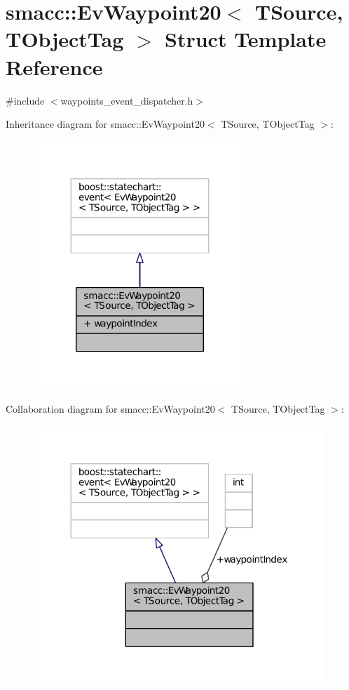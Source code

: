 \hypertarget{structsmacc_1_1EvWaypoint20}{}\section{smacc\+:\+:Ev\+Waypoint20$<$ T\+Source, T\+Object\+Tag $>$ Struct Template Reference}
\label{structsmacc_1_1EvWaypoint20}


{\ttfamily \#include $<$waypoints\+\_\+event\+\_\+dispatcher.\+h$>$}



Inheritance diagram for smacc\+:\+:Ev\+Waypoint20$<$ T\+Source, T\+Object\+Tag $>$\+:
\nopagebreak
\begin{figure}[H]
\begin{center}
\leavevmode
\includegraphics[width=227pt]{structsmacc_1_1EvWaypoint20__inherit__graph}
\end{center}
\end{figure}


Collaboration diagram for smacc\+:\+:Ev\+Waypoint20$<$ T\+Source, T\+Object\+Tag $>$\+:
\nopagebreak
\begin{figure}[H]
\begin{center}
\leavevmode
\includegraphics[width=312pt]{structsmacc_1_1EvWaypoint20__coll__graph}
\end{center}
\end{figure}
